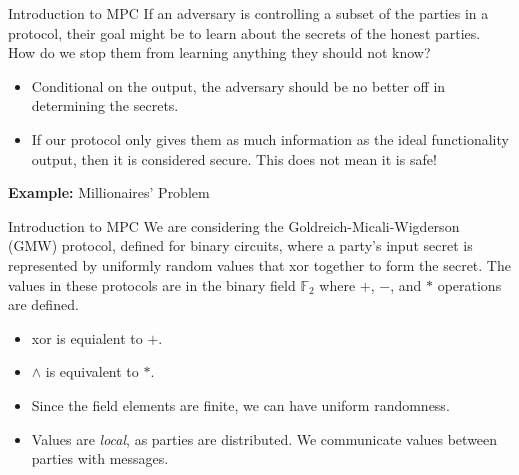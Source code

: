 \documentclass{beamer}
\begin{document}
\begin{frame}{Introduction to MPC}
    If an adversary is controlling a subset of the parties in a protocol, their goal might be to learn about the secrets of the honest parties. How do we stop them from learning anything they should not know?
    \begin{itemize}
    \item Conditional on the output, the adversary should be no better off in determining the secrets.
    \item If our protocol only gives them as much information as the ideal functionality output, then it is considered secure. This does not mean it is safe!
    \end{itemize}
    \textbf{Example:} Millionaires' Problem

\end{frame}
\begin{frame}{Introduction to MPC}
    We are considering the Goldreich-Micali-Wigderson (GMW) protocol, defined for binary circuits, where a party's input secret is represented by uniformly random values that xor together to form the secret. The values in these protocols are in the binary field $\mathbb{F}_2$ where $+$, $-$, and $*$ operations are defined.
    \begin{itemize}
    \item xor is equialent to $+$.
    \item $\wedge$ is equivalent to $*$.
    \item Since the field elements are finite, we can have uniform randomness.
    \item Values are \textit{local}, as parties are distributed. We communicate values between parties with messages. 
    \end{itemize}
\end{frame}
\end{document}
